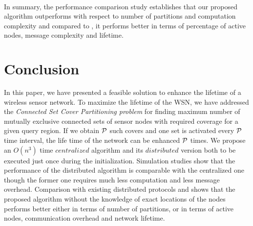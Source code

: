 \documentclass{acm_proc_article-sp}
\begin{document}
\\In summary, the performance comparison study establishes that our proposed algorithm outperforms \cite{Pervin} with respect to number of partitions and computation complexity and compared to \cite{Gallais}, it performs better in terms of percentage of active nodes, message complexity and lifetime.


\section{Conclusion}
\label{sec_5}
In this paper, we have presented a feasible solution to enhance the lifetime of a wireless sensor network. To maximize the lifetime of the WSN, we have addressed the {\it Connected Set Cover Partitioning problem} for finding maximum number of mutually exclusive connected sets of sensor nodes with required coverage for a given query region. If we obtain $\cal P$ such covers and one set is activated every $\cal P$ time interval, the life time of the network can be enhanced $\cal P$ times. We propose an $O(n^3)$ time $centralized$ algorithm and its $distributed$ version both to be executed just once during the initialization. Simulation studies show that the performance of the distributed algorithm is comparable with the centralized one though the former one requires much less computation and less message overhead. Comparison with existing distributed protocols \cite{Pervin} and \cite{Gallais} shows that the proposed algorithm without the knowledge of exact locations of the nodes performs better either in terms 
of number of partitions, or in terms of active nodes, communication overhead and network lifetime.



 

\end{document}
